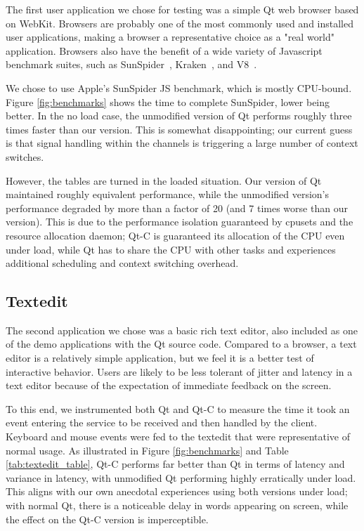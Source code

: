 \documentclass[letterpaper,twocolumn,11pt]{article}
\begin{document}
The first user application we chose for testing was a simple Qt web browser based on WebKit. Browsers are probably one of the most commonly used and installed user applications, making a browser a representative choice as a "real world" application. Browsers also have the benefit of a wide variety of Javascript benchmark suites, such as SunSpider~\cite{sunspider}, Kraken~\cite{kraken}, and V8~\cite{v8benchmark}.

We chose to use Apple's SunSpider JS benchmark, which is mostly CPU-bound. Figure \ref{fig:benchmarks} shows the time to complete SunSpider, lower being better. In the no load case, the unmodified version of Qt performs roughly three times faster than our version. This is somewhat disappointing; our current guess is that signal handling within the channels is triggering a large number of context switches.

However, the tables are turned in the loaded situation. Our version of Qt maintained roughly equivalent performance, while the unmodified version's performance degraded by more than a factor of 20 (and 7 times worse than our version). This is due to the performance isolation guaranteed by cpusets and the resource allocation daemon; Qt-C is guaranteed its allocation of the CPU even under load, while Qt has to share the CPU with other tasks and experiences additional scheduling and context switching overhead.

\subsection{Textedit}

The second application we chose was a basic rich text editor, also included as one of the demo applications with the Qt source code. Compared to a browser, a text editor is a relatively simple application, but we feel it is a better test of interactive behavior. Users are likely to be less tolerant of jitter and latency in a text editor because of the expectation of immediate feedback on the screen. 

To this end, we instrumented both Qt and Qt-C to measure the time it took an event entering the service to be received and then handled by the client. Keyboard and mouse events were fed to the textedit that were representative of normal usage. As illustrated in Figure \ref{fig:benchmarks} and Table \ref{tab:textedit_table}, Qt-C performs far better than Qt in terms of latency and variance in latency, with unmodified Qt performing highly erratically under load. This aligns with our own anecdotal experiences using both versions under load; with normal Qt, there is a noticeable delay in words appearing on screen, while the effect on the Qt-C version is imperceptible.
\end{document}
